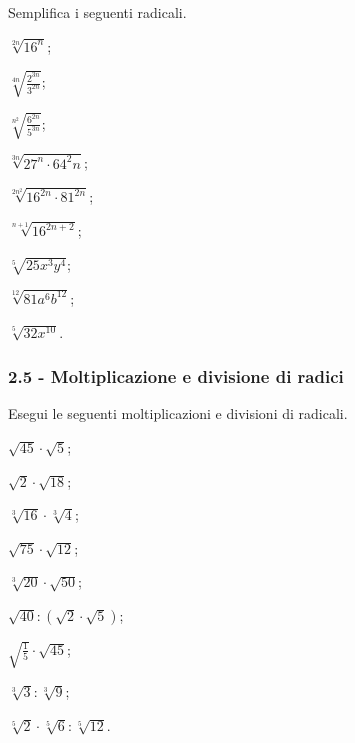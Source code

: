 \begin{esercizio}[\Ast]
	\label{ese:2.35}
	Semplifica i seguenti radicali.
	\begin{multicols}{3}
		\begin{enumeratea}
			\item $\sqrt[2n]{16^n}$;
			\item $\sqrt[4n]{\frac{2^{3n}}{3^{2n}}}$;
			\item $\sqrt[n^2]{\frac{6^{2n}}{5^{3n}}}$;
			\item $\sqrt[3n]{27^n\cdot 64^2n}$;
			\item $\sqrt[2n^2]{16^{2n}\cdot 81^{2n}}$;
			\item $\sqrt[n+1]{16^{2n+2}}$;
			\item $\sqrt[5]{25x^3y^4}$;
			\item $\sqrt[12]{81a^6b^{12}}$;
			\item $\sqrt[5]{32x^{10}}$.
		\end{enumeratea}
	\end{multicols}
\end{esercizio}

\subsubsection*{2.5 - Moltiplicazione e divisione di radici}
\begin{esercizio}[\Ast]
 \label{ese:2.36}
Esegui le seguenti moltiplicazioni e divisioni di radicali.
 \begin{multicols}{3}
 \begin{enumeratea}
 \item $\sqrt{45}\cdot \sqrt 5$;
 \item $\sqrt 2\cdot \sqrt{18}$;
 \item $\sqrt[3]{16}\cdot \sqrt[3]4$;
 \item $\sqrt{75}\cdot \sqrt{12}$;
 \item $\sqrt[3]{20}\cdot \sqrt{50}$;
 \item $\sqrt{40}:\left(\sqrt 2\cdot \sqrt 5\right)$;
 \item $\sqrt{\frac 1 5}\cdot \sqrt{45}$;
 \item $\sqrt[3]3:\sqrt[3]9$;
 \item $\sqrt[5]2\cdot \sqrt[5]6:\sqrt[5]{12}$.
 \end{enumeratea}
 \end{multicols}
\end{esercizio}

